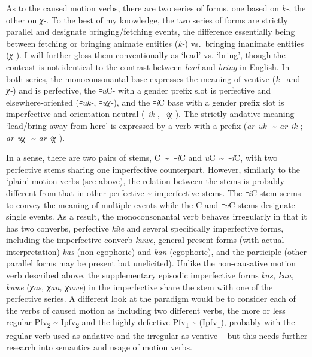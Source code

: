 \documentclass[output=paper]{langsci/langscibook}
\begin{document}
As to the caused motion verbs, there are two series of forms, one based
on \emph{k-}, the other on \emph{χ-}. To the best of my knowledge, the
two series of forms are strictly parallel and designate
bringing/fetching events, the difference essentially being between fetching or
bringing animate entities (\emph{k-}) vs.\ bringing inanimate entities
(\emph{χ-}). I will further gloss them conventionally as `lead' vs.
`bring', though the contrast is not identical to the contrast between
\emph{lead} and \emph{bring} in English. In both series, the
monoconsonantal base expresses the meaning of ventive \mbox{(\emph{k-}}~and
\emph{χ-}) and is perfective, the \emph{꞊u}C- with a gender prefix slot
is perfective and elsewhere-oriented (\emph{꞊uk-}, \emph{꞊uχ-}), and the
\emph{꞊i}C base with a gender prefix slot is imperfective and orientation
neutral (\emph{꞊ik-}, \emph{꞊iχ-}). The strictly andative meaning
`lead/bring away from here' is expressed by a verb with a prefix
(\emph{ar꞊uk-} \textasciitilde{} \emph{ar꞊ik}-; \emph{ar꞊uχ-}
\textasciitilde{} \mbox{\emph{ar꞊iχ-}}).
{\par}

In a sense, there are two pairs of stems, C~\textasciitilde{}~\emph{꞊i}C
and \emph{u}C~\textasciitilde{}~\emph{꞊i}C, with two perfective stems
sharing one imperfective counterpart. However, similarly to the `plain'
motion verbs (see above), the relation between the stems is probably
different from that in other perfective \textasciitilde{} imperfective
stems. The \emph{꞊i}C stem seems to convey the meaning of multiple
events while the C and \emph{꞊u}C stems designate single events. As a
result, the monoconsonantal verb behaves irregularly in that it has two
converbs, perfective \emph{kile} and several specifically imperfective
forms, including the imperfective converb \emph{kuwe}, general present
forms (with actual interpretation) \emph{kas} (non-egophoric) and
\emph{kan} (egophoric), and the participle (other parallel forms may be
present but unelicited). Unlike the non-causative motion verb described
above, the supplementary episodic imperfective forms \emph{kas, kan,
kuwe} (\emph{χas, χan, χuwe}) in the imperfective share the stem with
one of the perfective series. A different look at the paradigm would be
to consider each of the verbs of caused motion as including two
different verbs, the more or less regular Pfv\textsubscript{2}
\textasciitilde{} Ipfv\textsubscript{2} and the highly defective
Pfv\textsubscript{1} \textasciitilde{} (Ipfv\textsubscript{1}), probably
with the regular verb used as andative and the irregular as ventive –
but this needs further research into semantics and usage of motion
verbs.
\end{document}

